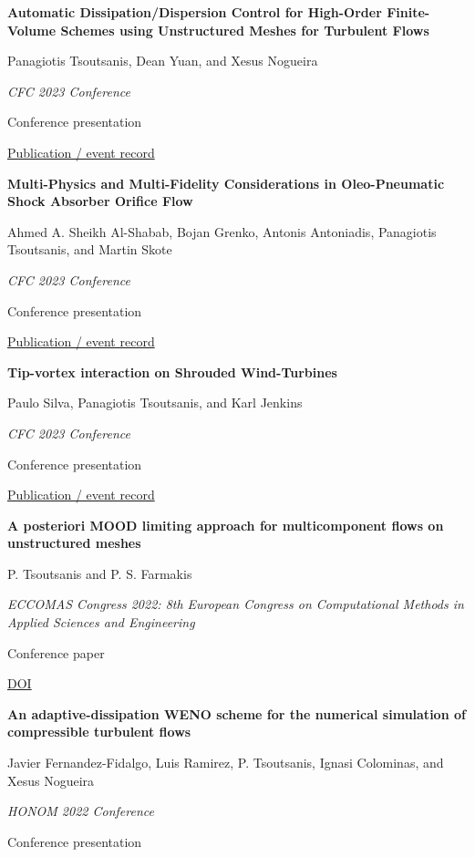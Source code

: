 \documentclass[11pt,a4paper]{article}
\newlength{\cventrysep}
\newenvironment{cventry}{%
  \par\noindent\begin{minipage}{\linewidth}
  \RaggedRight\fontsize{9.8}{12.5}\selectfont
}{\end{minipage}\par\addvspace{\cventrysep}}
\newcommand{\cvtitle}[1]{{\bfseries #1\par}\vspace{1pt}}
\newcommand{\cvdetail}[1]{{#1\par}\vspace{1pt}}
\newcommand{\cvmeta}[1]{{\fontsize{9}{11.5}\selectfont\color{Muted}#1\par}\vspace{1pt}}
\newcommand{\cvlinks}[1]{{\fontsize{9}{11.5}\selectfont #1\par}}
\newcommand{\cvyear}[1]{{\color{Teal}\bfseries\fontsize{11}{13}\selectfont #1\par}\vspace{6pt}}
\begin{document}
\begin{cventry}
\cvtitle{Automatic Dissipation/Dispersion Control for High-Order Finite-Volume Schemes using Unstructured Meshes for Turbulent Flows}
\cvdetail{Panagiotis Tsoutsanis, Dean Yuan, and Xesus Nogueira}
\cvmeta{\textit{CFC 2023 Conference}\par Conference presentation}
\cvlinks{\href{https://cfc2023.iacm.info/event/contribution/1a714b46-3348-11ed-8e5b-000c29ddfc0c}{Publication / event record}}
\end{cventry}

\begin{cventry}
\cvtitle{Multi-Physics and Multi-Fidelity Considerations in Oleo-Pneumatic Shock Absorber Orifice Flow}
\cvdetail{Ahmed A. Sheikh Al-Shabab, Bojan Grenko, Antonis Antoniadis, Panagiotis Tsoutsanis, and Martin Skote}
\cvmeta{\textit{CFC 2023 Conference}\par Conference presentation}
\cvlinks{\href{https://cfc2023.iacm.info/event/contribution/2a8ddc78-489c-11ed-9b3c-000c29ddfc0c}{Publication / event record}}
\end{cventry}

\begin{cventry}
\cvtitle{Tip-vortex interaction on Shrouded Wind-Turbines}
\cvdetail{Paulo Silva, Panagiotis Tsoutsanis, and Karl Jenkins}
\cvmeta{\textit{CFC 2023 Conference}\par Conference presentation}
\cvlinks{\href{https://cfc2023.iacm.info/event/contribution/2b310242-38d2-11ed-8e5b-000c29ddfc0c}{Publication / event record}}
\end{cventry}

\begin{cventry}
\cvyear{2022}
\cvtitle{A posteriori MOOD limiting approach for multicomponent flows on unstructured meshes}
\cvdetail{P. Tsoutsanis and P. S. Farmakis}
\cvmeta{\textit{ECCOMAS Congress 2022: 8th European Congress on Computational Methods in Applied Sciences and Engineering}\par Conference paper}
\cvlinks{\href{https://doi.org/10.23967/eccomas.2022.026}{DOI}}
\end{cventry}

\begin{cventry}
\cvtitle{An adaptive-dissipation WENO scheme for the numerical simulation of compressible turbulent flows}
\cvdetail{Javier Fernandez-Fidalgo, Luis Ramirez, P. Tsoutsanis, Ignasi Colominas, and Xesus Nogueira}
\cvmeta{\textit{HONOM 2022 Conference}\par Conference presentation}
\end{cventry}
\end{document}
